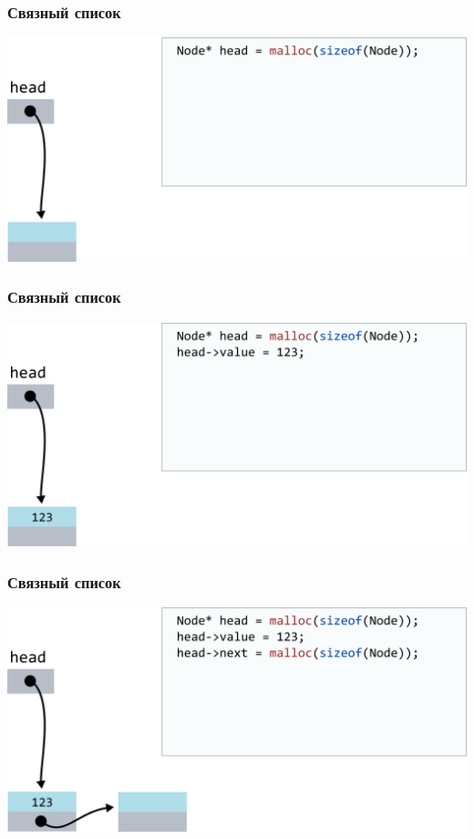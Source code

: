 \documentclass[10pt,pdf,hyperref={unicode}]{beamer}
\begin{document}
\begin{frame}[fragile]
\frametitle{Связный список}
\begin{center}
\includegraphics[width=\imageSizeMult\linewidth]{../images/codelist/codelist2.png}
\end{center}
\end{frame}


\begin{frame}[fragile]
\frametitle{Связный список}
\begin{center}
\includegraphics[width=\imageSizeMult\linewidth]{../images/codelist/codelist3.png}
\end{center}
\end{frame}


\begin{frame}[fragile]
\frametitle{Связный список}
\begin{center}
\includegraphics[width=\imageSizeMult\linewidth]{../images/codelist/codelist4.png}
\end{center}
\end{frame}
\end{document}
